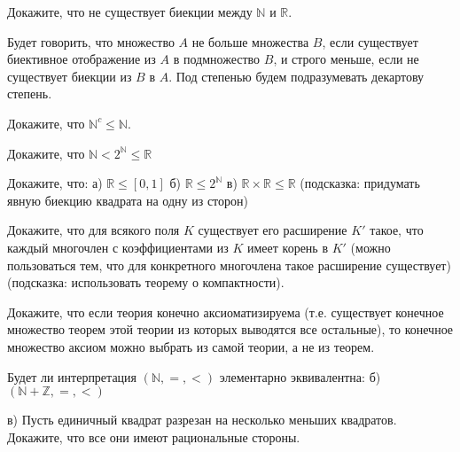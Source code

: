 \setcounter{curtask}{24}


\begin{task}
    Докажите, что не существует биекции между $\mathbb{N}$ и $\mathbb{R}$.
\end{task}

Будет говорить, что множество $A$ не больше множества $B$, если
существует биективное отображение из $A$ в подмножество $B$, и строго
меньше, если не существует биекции из $B$ в $A$. Под степенью будем
подразумевать декартову степень.

\begin{task}
    Докажите, что $\mathbb{N}^c \le \mathbb{N}$.
\end{task}

\begin{task}
    Докажите, что $\mathbb{N} < 2^{\mathbb{N}} \le \mathbb{R}$
\end{task}

\begin{task}
    Докажите, что:
    а) $\mathbb{R} \le [0, 1]$
    б) $\mathbb{R} \le 2^{\mathbb{N}}$
    в) $\mathbb{R} \times \mathbb{R} \le \mathbb{R}$ (подсказка:
	    придумать явную биекцию квадрата на одну из сторон)
\end{task}

\begin{task}
    Докажите, что для всякого поля $K$ существует его расширение $K'$
    такое, что каждый многочлен с коэффициентами из $K$ имеет корень
    в $K'$ (можно пользоваться тем, что для конкретного многочлена
    такое расширение существует) (подсказка: использовать теорему о компактности).
\end{task}

\begin{task}
    Докажите, что если теория конечно аксиоматизируема
    (т.е. существует конечное множество теорем этой теории из которых выводятся все
    остальные), то конечное множество аксиом можно выбрать из самой
    теории, а не из теорем.
\end{task}

\breakline

\begin{ptask}{13}
    Будет ли интерпретация $(\mathbb{N}, =, <)$ элементарно
    эквивалентна:
    б) $(\mathbb{N} + \mathbb{Z}, =, <)$
\end{ptask}

\begin{ptask}{14}
    в) Пусть единичный квадрат разрезан на несколько меньших
    квадратов. Докажите, что все они имеют рациональные стороны.
\end{ptask}

